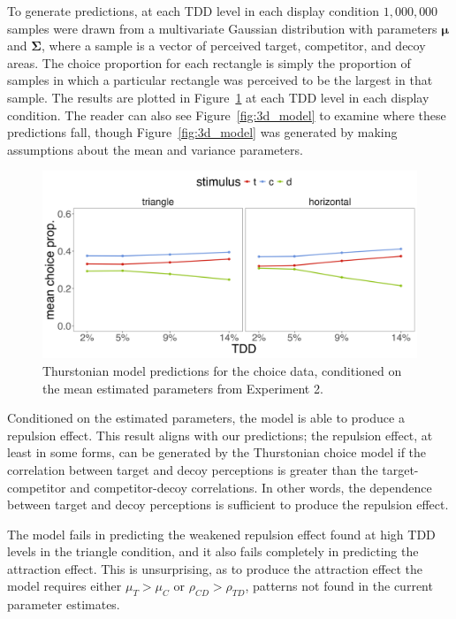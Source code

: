 To generate predictions, at each TDD level in each display condition $1,000,000$ samples were drawn from a multivariate Gaussian distribution with parameters $\boldsymbol{\mu}$ and $\boldsymbol{\Sigma}$, where a sample is a vector of perceived target, competitor, and decoy areas. The choice proportion for each rectangle is simply the proportion of samples in which a particular rectangle was perceived to be the largest in that sample. The results are plotted in Figure~\ref{fig:e2_model_preds} at each TDD level in each display condition. The reader can also see Figure~\ref{fig:3d_model} to examine where these predictions fall, though Figure~\ref{fig:3d_model} was generated by making assumptions about the mean and variance parameters. 

\begin{figure}
   \centering
   \includegraphics[width=\textwidth]{figures/bayes_circle_area_sim_choice_sigma_constant_comp_effect.jpeg}
   \caption{Thurstonian model predictions for the choice data, conditioned on the mean estimated parameters from Experiment 2.}
   \label{fig:e2_model_preds}
\end{figure}

Conditioned on the estimated parameters, the model is able to produce a repulsion effect. This result aligns with our predictions; the repulsion effect, at least in some forms, can be generated by the Thurstonian choice model if the correlation between target and decoy perceptions is greater than the target-competitor and competitor-decoy correlations. In other words, the dependence between target and decoy perceptions is sufficient to produce the repulsion effect.

The model fails in predicting the weakened repulsion effect found at high TDD levels in the triangle condition, and it also fails completely in predicting the attraction effect. This is unsurprising, as to produce the attraction effect the model requires either $\mu_{T}>\mu_{C}$ or $\rho_{CD}>\rho_{TD}$, patterns not found in the current parameter estimates. 

